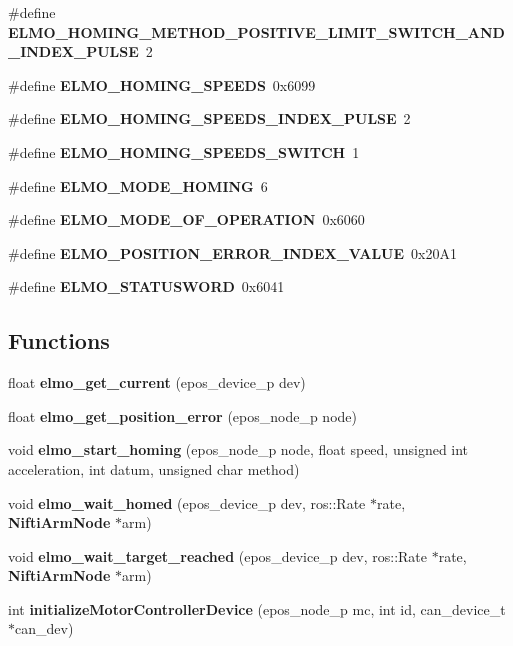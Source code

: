 \begin{DoxyCompactItemize}
\item 
\#define {\bf \-E\-L\-M\-O\-\_\-\-H\-O\-M\-I\-N\-G\-\_\-\-M\-E\-T\-H\-O\-D\-\_\-\-P\-O\-S\-I\-T\-I\-V\-E\-\_\-\-L\-I\-M\-I\-T\-\_\-\-S\-W\-I\-T\-C\-H\-\_\-\-A\-N\-D\-\_\-\-I\-N\-D\-E\-X\-\_\-\-P\-U\-L\-S\-E}~2
\item 
\#define {\bf \-E\-L\-M\-O\-\_\-\-H\-O\-M\-I\-N\-G\-\_\-\-S\-P\-E\-E\-D\-S}~0x6099
\item 
\#define {\bf \-E\-L\-M\-O\-\_\-\-H\-O\-M\-I\-N\-G\-\_\-\-S\-P\-E\-E\-D\-S\-\_\-\-I\-N\-D\-E\-X\-\_\-\-P\-U\-L\-S\-E}~2
\item 
\#define {\bf \-E\-L\-M\-O\-\_\-\-H\-O\-M\-I\-N\-G\-\_\-\-S\-P\-E\-E\-D\-S\-\_\-\-S\-W\-I\-T\-C\-H}~1
\item 
\#define {\bf \-E\-L\-M\-O\-\_\-\-M\-O\-D\-E\-\_\-\-H\-O\-M\-I\-N\-G}~6
\item 
\#define {\bf \-E\-L\-M\-O\-\_\-\-M\-O\-D\-E\-\_\-\-O\-F\-\_\-\-O\-P\-E\-R\-A\-T\-I\-O\-N}~0x6060
\item 
\#define {\bf \-E\-L\-M\-O\-\_\-\-P\-O\-S\-I\-T\-I\-O\-N\-\_\-\-E\-R\-R\-O\-R\-\_\-\-I\-N\-D\-E\-X\-\_\-\-V\-A\-L\-U\-E}~0x20\-A1
\item 
\#define {\bf \-E\-L\-M\-O\-\_\-\-S\-T\-A\-T\-U\-S\-W\-O\-R\-D}~0x6041
\end{DoxyCompactItemize}
\subsection*{\-Functions}
\begin{DoxyCompactItemize}
\item 
float {\bf elmo\-\_\-get\-\_\-current} (epos\-\_\-device\-\_\-p dev)
\item 
float {\bf elmo\-\_\-get\-\_\-position\-\_\-error} (epos\-\_\-node\-\_\-p node)
\item 
void {\bf elmo\-\_\-start\-\_\-homing} (epos\-\_\-node\-\_\-p node, float speed, unsigned int acceleration, int datum, unsigned char method)
\item 
void {\bf elmo\-\_\-wait\-\_\-homed} (epos\-\_\-device\-\_\-p dev, ros\-::\-Rate $\ast$rate, {\bf \-Nifti\-Arm\-Node} $\ast$arm)
\item 
void {\bf elmo\-\_\-wait\-\_\-target\-\_\-reached} (epos\-\_\-device\-\_\-p dev, ros\-::\-Rate $\ast$rate, {\bf \-Nifti\-Arm\-Node} $\ast$arm)
\item 
int {\bf initialize\-Motor\-Controller\-Device} (epos\-\_\-node\-\_\-p mc, int id, can\-\_\-device\-\_\-t $\ast$can\-\_\-dev)
\end{DoxyCompactItemize}


